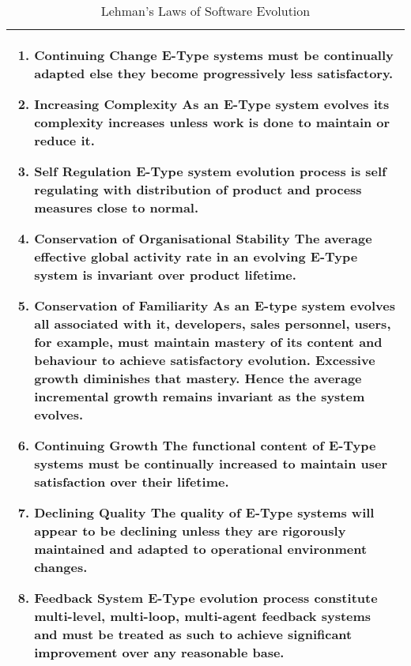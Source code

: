 \documentclass{sig-alternate}
\begin{document}
\begin{table}
       \centering
       \begin{tabular}[ht]{p{3in}}
       \toprule
              \begin{enumerate}
              \item \textbf{Continuing Change}  \newline
              E-Type systems must be continually adapted else they become progressively less satisfactory.                     
              \item \textbf{Increasing Complexity} \newline
              As an E-Type system evolves its complexity increases unless work is done to maintain or reduce it.                  
              \item \textbf{Self Regulation} \newline
              E-Type system evolution process is self regulating with distribution of product and process measures close to normal.                     
              \item \textbf{Conservation of Organisational Stability} \newline
              The average effective global activity rate in an evolving E-Type system is invariant over product lifetime.                     
              \item \textbf{Conservation of Familiarity} \newline
              As an E-type system evolves all associated with it, developers, sales personnel, users, for example, must maintain mastery of its content and behaviour to achieve satisfactory evolution. Excessive growth diminishes that mastery. Hence the average incremental growth remains invariant as the system evolves.                     
              \item \textbf{Continuing Growth} \newline
              The functional content of E-Type systems must be continually increased to maintain user satisfaction over their lifetime.                
              \item \textbf{Declining Quality} \newline
              The quality of E-Type systems will appear to be declining unless they are rigorously maintained and adapted to operational environment changes.                     
              \item \textbf{Feedback System} \newline
              E-Type evolution process constitute multi-level, multi-loop, multi-agent feedback systems and must be treated as such to achieve significant improvement over any reasonable base.

              \end{enumerate} \\
              \bottomrule
       \end{tabular}
       \caption{Lehman's Laws of Software Evolution \cite{lehman90sview}}
       \label{table:expl_laws}
\end{table}
\end{document}
